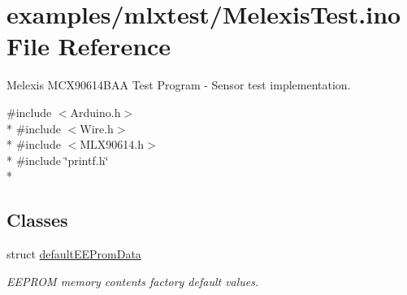 \hypertarget{_melexis_test_8ino}{\section{examples/mlxtest/\-Melexis\-Test.ino File Reference}
\label{_melexis_test_8ino}
}


Melexis M\-C\-X90614\-B\-A\-A Test Program -\/ Sensor test implementation.  


{\ttfamily \#include $<$Arduino.\-h$>$}\\*
{\ttfamily \#include $<$Wire.\-h$>$}\\*
{\ttfamily \#include $<$M\-L\-X90614.\-h$>$}\\*
{\ttfamily \#include \char`\"{}printf.\-h\char`\"{}}\\*
\subsection*{Classes}
\begin{DoxyCompactItemize}
\item 
struct \hyperlink{structdefault_e_e_prom_data}{default\-E\-E\-Prom\-Data}
\begin{DoxyCompactList}\small\item\em E\-E\-P\-R\-O\-M memory contents factory default values. \end{DoxyCompactList}\end{DoxyCompactItemize}
